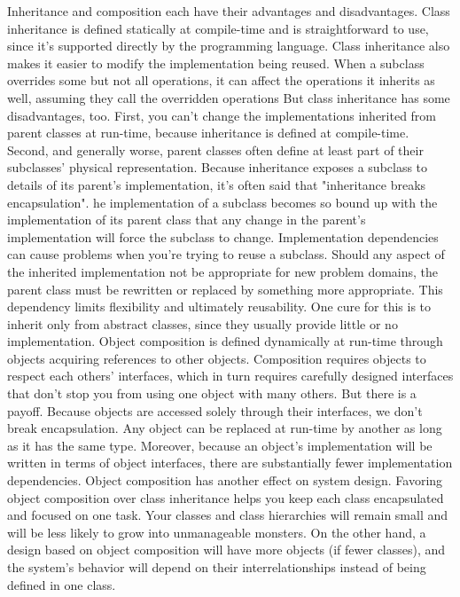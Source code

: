 \documentclass{report}
\begin{document}
\begin{itemize}
            \bigbreak \noindent 
            Inheritance and composition each have their advantages and disadvantages. Class inheritance is defined statically at compile-time and is straightforward to use, since it's supported directly by the programming language. Class inheritance also makes it easier to modify the implementation being reused. When a subclass overrides some but not all operations, it can affect the operations it inherits as well, assuming they call the overridden operations
            \bigbreak \noindent 
            But class inheritance has some disadvantages, too. First, you can't change the implementations inherited from parent classes at run-time, because inheritance is defined at compile-time. Second, and generally worse, parent classes often define at least part of their subclasses' physical representation. Because inheritance exposes a subclass to details of its parent's implementation, it's often said that "inheritance breaks encapsulation". he implementation of a subclass becomes so bound up with the implementation of its parent class that any change in the parent's implementation will force the subclass to change.
            \bigbreak \noindent 
            Implementation dependencies can cause problems when you're trying to reuse a subclass. Should any aspect of the inherited implementation not be appropriate for new problem domains, the parent class must be rewritten or replaced by something more appropriate. This dependency limits flexibility and ultimately reusability. One cure for this is to inherit only from abstract classes, since they usually provide little or no implementation.
            \bigbreak \noindent 
            Object composition is defined dynamically at run-time through objects acquiring references to other objects. Composition requires objects to respect each others' interfaces, which in turn requires carefully designed interfaces that don't stop you from using one object with many others. But there is a payoff. Because objects are accessed solely through their interfaces, we don't break encapsulation. Any object can be replaced at run-time by another as long as it has the same type. Moreover, because an object's implementation will be written in terms of object interfaces, there are substantially fewer implementation dependencies.
            \bigbreak \noindent 
            Object composition has another effect on system design. Favoring object composition over class inheritance helps you keep each class encapsulated and focused on one task. Your classes and class hierarchies will remain small and will be less likely to grow into unmanageable monsters. On the other hand, a design based on object composition will have more objects (if fewer classes), and the system's behavior will depend on their interrelationships instead of being defined in one class.

\end{itemize}
\end{document}
